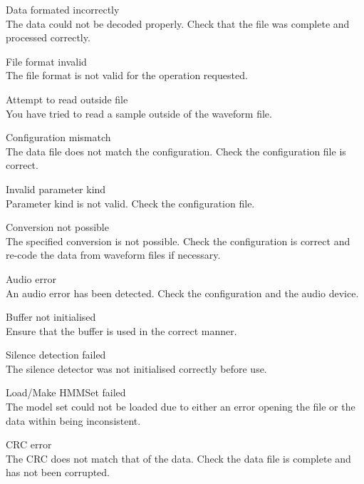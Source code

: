 \begin{itemize}
\begin{itemize}
    Data formated incorrectly\\
        The data could not be decoded properly.  Check that the file was 
        complete and processed correctly.

    File format invalid\\
        The file format is not valid for the operation requested.

    Attempt to read outside file\\
        You have tried to read a sample outside of the waveform file.

\end{itemize}


\begin{itemize}
    Configuration mismatch\\
        The data file does not match the configuration.  Check the 
        configuration file is correct.

    Invalid parameter kind\\
        Parameter kind is not valid.  Check the configuration file.

    Conversion not possible\\
        The specified conversion is not possible.  Check the configuration is
        correct and re-code the data from waveform files if necessary.

    Audio error\\
        An audio error has been detected.  Check the  
        configuration and the audio device.

    Buffer not initialised\\
        Ensure that the buffer is used in the correct manner.

    Silence detection failed\\
        The silence detector was not initialised correctly before use.

    Load/Make HMMSet failed\\
        The model set could not be loaded due to either an error opening the
        file or the data within being inconsistent.

    CRC error\\
        The CRC does not match that of the data.  Check the data file is 
        complete and has not been corrupted.


\end{itemize}
\end{itemize}
